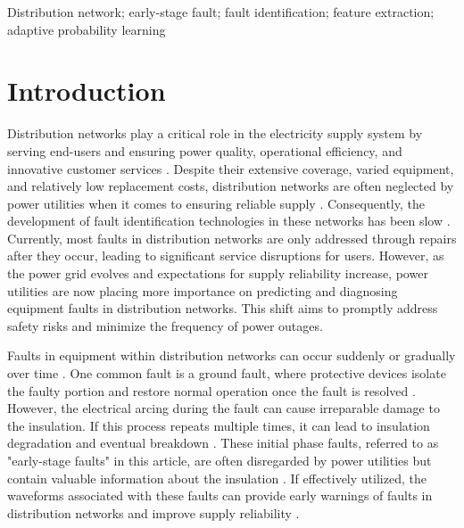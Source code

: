 \documentclass[conference]{IEEEtran}
\begin{document}
\begin{IEEEkeywords}
Distribution network; early-stage fault; fault identification; feature extraction; adaptive probability learning
\end{IEEEkeywords}

\section{Introduction}

Distribution networks play a critical role in the electricity supply system by serving end-users and ensuring power quality, operational efficiency, and innovative customer services \cite{xiao2020overview} \cite{sun2020development}. Despite their extensive coverage, varied equipment, and relatively low replacement costs, distribution networks are often neglected by power utilities when it comes to ensuring reliable supply \cite{wang2020review}. Consequently, the development of fault identification technologies in these networks has been slow \cite{wang2020review}. Currently, most faults in distribution networks are only addressed through repairs after they occur, leading to significant service disruptions for users. However, as the power grid evolves and expectations for supply reliability increase, power utilities are now placing more importance on predicting and diagnosing equipment faults in distribution networks. This shift aims to promptly address safety risks and minimize the frequency of power outages.

Faults in equipment within distribution networks can occur suddenly or gradually over time \cite{xiong2020detection}. One common fault is a ground fault, where protective devices isolate the faulty portion and restore normal operation once the fault is resolved \cite{yang2020location}. However, the electrical arcing during the fault can cause irreparable damage to the insulation. If this process repeats multiple times, it can lead to insulation degradation and eventual breakdown \cite{yang2019simulation}. These initial phase faults, referred to as "early-stage faults" in this article, are often disregarded by power utilities but contain valuable information about the insulation \cite{fang2020development}. If effectively utilized, the waveforms associated with these faults can provide early warnings of faults in distribution networks and improve supply reliability \cite{li2020anomaly} \cite{chen2020research}.
\end{document}
